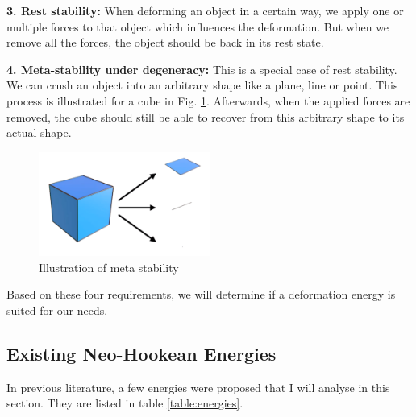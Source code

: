 \textbf{3. Rest stability:} When deforming an object in a certain way, we apply one or multiple forces to that object which influences the deformation. But when we remove all the forces, the object should be back in its rest state.

\textbf{4. Meta-stability under degeneracy:} This is a special case of rest stability. We can crush an object into an arbitrary shape like a plane, line or point. This process is illustrated for a cube in Fig. \ref{fig:meta_stability}. Afterwards, when the applied forces are removed, the cube should still be able to recover from this arbitrary shape to its actual shape.

\begin{figure}[!htbp]
	\centering
	\includegraphics[width=0.5\textwidth]{resources/meta_stability}
	\caption[Illustration of meta stability]{Illustration of meta stability {\cite{STREAM2018}}}
	\label{fig:meta_stability}
\end{figure}

Based on these four requirements, we will determine if a deformation energy is suited for our needs.



\subsection{Existing Neo-Hookean Energies}

In previous literature, a few energies were proposed that I will analyse in this section. They are listed in table \ref{table:energies}.

